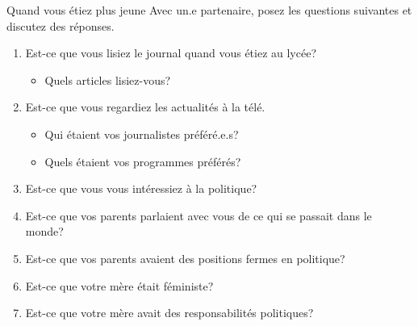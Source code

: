 \begin{frame}{Quand vous étiez plus jeune}
  Avec un.e partenaire, posez les questions suivantes et discutez des réponses.
  \begin{enumerate}
    \item Est-ce que vous lisiez le journal quand vous étiez au lycée?
    \begin{itemize}
      \item Quels articles lisiez-vous?
    \end{itemize}
    \item Est-ce que vous regardiez les actualités à la télé.
    \begin{itemize}
      \item Qui étaient vos journalistes préféré.e.s?
      \item Quels étaient vos programmes préférés?
    \end{itemize}
    \item Est-ce que vous vous intéressiez à la politique?
    \item Est-ce que vos parents parlaient avec vous de ce qui se passait dans le monde?
    \item Est-ce que vos parents avaient des positions fermes en politique?
    \item Est-ce que votre mère était féministe?
    \item Est-ce que votre mère avait des responsabilités politiques?
  \end{enumerate}
\end{frame}